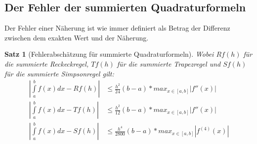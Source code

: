 \documentclass{article}
\theoremstyle{satz}
\newtheorem*{satz}{Satz}
\theoremstyle{definition}
\begin{document}
\subsection{Der Fehler der summierten Quadraturformeln}
Der Fehler einer Näherung ist wie immer definiert als Betrag der Differenz zwischen dem exakten Wert und der Näherung. 
\theoremstyle{satz}
\begin{tcolorbox}
\begin{satz}[Fehlerabschätzung für summierte Quadraturformeln]
Wobei $Rf(h)$ für die summierte Reckeckregel, $Tf(h)$ für die summierte Trapezregel und $Sf(h)$ für die summierte Simpsonregel gilt:
\begin{equation}
\begin{split}
|\int\limits_a^{b}f(x)dx-Rf(h)| & \leq \frac{h^2}{24}(b-a) * max_{x\in[a,b]}|f''(x)|\\
|\int\limits_a^{b}f(x)dx-Tf(h)| & \leq \frac{h^2}{12}(b-a) * max_{x\in[a,b]}|f''(x)|\\
|\int\limits_a^{b}f(x)dx-Sf(h)| & \leq \frac{h^4}{2800}(b-a) * max_{x\in[a,b]}|f^{(4)}(x)|\\
\end{split}
\end{equation}
\end{satz}
\end{tcolorbox}
\end{document}
